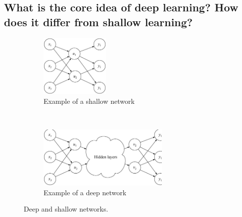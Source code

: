 \documentclass[../main.tex]{subfiles}
\begin{document}
\subsection{What is the core idea of deep learning? How does it differ from shallow learning?}

\begin{figure}
    \centering
    \begin{subfigure}[b]{0.48\textwidth}
        \includegraphics[height=3cm]{figures/theory/shallow_network}
        \caption{Example of a shallow network}
        \label{fig:shallow_example}
    \end{subfigure}
    ~ %
    \begin{subfigure}[b]{0.48\textwidth}
        \includegraphics[height=3cm]{figures/theory/deep_network}
        \caption{Example of a deep network}
        \label{fig:deep_example}
    \end{subfigure}
    \caption{Deep and shallow networks.}\label{fig:deep_shallow}
\end{figure}
\end{document}
